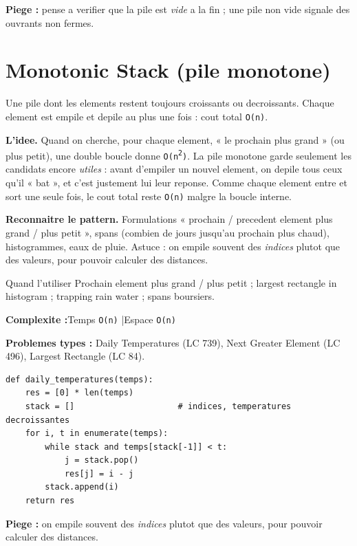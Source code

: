 \documentclass[11pt,a4paper]{article}
\newcommand{\complexite}[2]{%
  \noindent\textbf{Complexite :}\quad Temps \texttt{#1} \quad|\quad Espace \texttt{#2}\par\smallskip}
\newcommand{\leetcode}[1]{\noindent\textbf{Problemes types :} #1\par\medskip}
\begin{document}
\textbf{Piege :} pense a verifier que la pile est \emph{vide} a la fin ; une pile
non vide signale des ouvrants non fermes.

\section{Monotonic Stack (pile monotone)}
Une pile dont les elements restent toujours croissants ou decroissants. Chaque
element est empile et depile au plus une fois : cout total \texttt{O(n)}.

\textbf{L'idee.} Quand on cherche, pour chaque element, « le prochain plus
grand » (ou plus petit), une double boucle donne \texttt{O(n\textsuperscript{2})}.
La pile monotone garde seulement les candidats encore \emph{utiles} : avant
d'empiler un nouvel element, on depile tous ceux qu'il « bat », et c'est
justement lui leur reponse. Comme chaque element entre et sort une seule fois, le
cout total reste \texttt{O(n)} malgre la boucle interne.

\textbf{Reconnaitre le pattern.} Formulations « prochain / precedent element plus
grand / plus petit », spans (combien de jours jusqu'au prochain plus chaud),
histogrammes, eaux de pluie. Astuce : on empile souvent des \emph{indices} plutot
que des valeurs, pour pouvoir calculer des distances.

\begin{infobox}{Quand l'utiliser}
Prochain element plus grand / plus petit ; largest rectangle in histogram ;
trapping rain water ; spans boursiers.
\end{infobox}

\complexite{O(n)}{O(n)}
\leetcode{Daily Temperatures (LC 739), Next Greater Element (LC 496), Largest Rectangle (LC 84).}

\begin{lstlisting}
def daily_temperatures(temps):
    res = [0] * len(temps)
    stack = []                     # indices, temperatures decroissantes
    for i, t in enumerate(temps):
        while stack and temps[stack[-1]] < t:
            j = stack.pop()
            res[j] = i - j
        stack.append(i)
    return res
\end{lstlisting}

\textbf{Piege :} on empile souvent des \emph{indices} plutot que des valeurs,
pour pouvoir calculer des distances.
\end{document}

